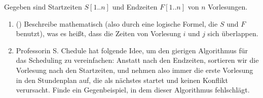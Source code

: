 \documentclass{uebung_cs}
\begin{document}
\begin{aufgabe}[Scheduling]
    Gegeben sind Startzeiten $S[1..n]$ und Endzeiten $F[1..n]$ von $n$ Vorlesungen.
    \begin{enumerate}
        \item(\warmup) Beschreibe mathematisch (also durch eine logische Formel, die $S$ und $F$ benutzt), was es heißt, dass die Zeiten von Vorlesung $i$ und $j$ sich überlappen.
        \item Professorin S. Chedule hat folgende Idee, um den gierigen Algorithmus für das Scheduling zu vereinfachen: Anstatt nach den Endzeiten, sortieren wir die Vorlesung nach den Startzeiten, und nehmen also immer die erste Vorlesung in den Stundenplan auf, die als nächstes startet und keinen Konflikt verursacht. Finde ein Gegenbeispiel, in dem dieser Algorithmus fehlschlägt.
    \end{enumerate}
\end{aufgabe}
\end{document}

